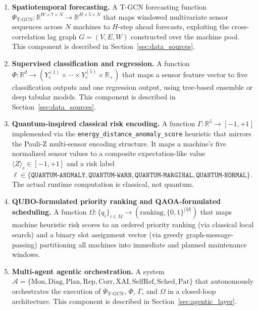 \begin{enumerate}
    \item \textbf{Spatiotemporal forecasting.} A T-GCN forecasting function $\Psi_{\text{T-GCN}}: \mathbb{R}^{W \times 7 \times N} \to \mathbb{R}^{H \times 5 \times N}$ that maps windowed multivariate sensor sequences across $N$ machines to $H$-step ahead forecasts, exploiting the cross-correlation lag graph $G = (V, E, W)$ constructed over the machine pool. This component is described in Section~\ref{sec:data_sources}.

    \item \textbf{Supervised classification and regression.} A function $\Phi: \mathbb{R}^{d} \to (Y_c^{(1)} \times \cdots \times Y_c^{(5)} \times \mathbb{R}_+)$ that maps a sensor feature vector to five classification outputs and one regression output, using tree-based ensemble or deep tabular models. This component is described in Section~\ref{sec:data_sources}.

    \item \textbf{Quantum-inspired classical risk encoding.} A function $\Gamma: \mathbb{R}^{5} \to [-1, +1]$ implemented via the \texttt{energy\_distance\_anomaly\_score} heuristic that mirrors the Pauli-Z multi-sensor encoding structure. It maps a machine's five normalized sensor values to a composite expectation-like value $\langle Z \rangle_c \in [-1, +1]$ and a risk label $\ell \in \{\texttt{QUANTUM-ANOMALY}, \texttt{QUANTUM-WARN}, \texttt{QUANTUM-MARGINAL}, \texttt{QUANTUM-NORMAL}\}$. The actual runtime computation is classical, not quantum.

    \item \textbf{QUBO-formulated priority ranking and QAOA-formulated scheduling.} A function $\Omega: \{q_i\}_{i \in M} \to (\text{ranking}, \{0,1\}^{|M|})$ that maps machine heuristic risk scores to an ordered priority ranking (via classical local search) and a binary slot assignment vector (via greedy graph-message-passing) partitioning all machines into immediate and planned maintenance windows.

    \item \textbf{Multi-agent agentic orchestration.} A system $\mathcal{A} = \{\text{Mon}, \text{Diag}, \text{Plan}, \text{Rep}, \text{Corr}, \text{XAI}, \text{SelfRef}, \text{Sched}, \text{Pat}\}$ that autonomously orchestrates the execution of $\Psi_{\text{T-GCN}}$, $\Phi$, $\Gamma$, and $\Omega$ in a closed-loop architecture. This component is described in Section~\ref{sec:agentic_layer}.
\end{enumerate}

